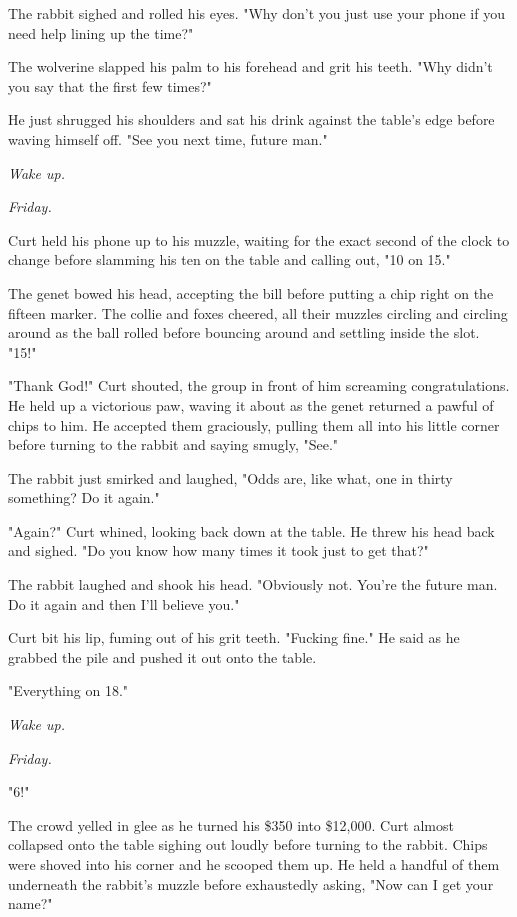 The rabbit sighed and rolled his eyes. "Why don't you just use your phone if you need help lining up the time?"

The wolverine slapped his palm to his forehead and grit his teeth. "Why didn't you say that the first few times?"

He just shrugged his shoulders and sat his drink against the table's edge before waving himself off. "See you next time, future man."

\emph{Wake up.}

\emph{Friday.}

Curt held his phone up to his muzzle, waiting for the exact second of the clock to change before slamming his ten on the table and calling out, "10 on 15."

The genet bowed his head, accepting the bill before putting a chip right on the fifteen marker. The collie and foxes cheered, all their muzzles circling and circling around as the ball rolled before bouncing around and settling inside the slot. "15!"

"Thank God!" Curt shouted, the group in front of him screaming congratulations. He held up a victorious paw, waving it about as the genet returned a pawful of chips to him. He accepted them graciously, pulling them all into his little corner before turning to the rabbit and saying smugly, "See."

The rabbit just smirked and laughed, "Odds are, like what, one in thirty something? Do it again."

"Again?" Curt whined, looking back down at the table. He threw his head back and sighed. "Do you know how many times it took just to get that?"

The rabbit laughed and shook his head. "Obviously not. You're the future man. Do it again and then I'll believe you."

Curt bit his lip, fuming out of his grit teeth. "Fucking fine." He said as he grabbed the pile and pushed it out onto the table.

"Everything on 18."

\emph{Wake up.}

\emph{Friday.}

"6!"

The crowd yelled in glee as he turned his \$350 into \$12,000. Curt almost collapsed onto the table sighing out loudly before turning to the rabbit. Chips were shoved into his corner and he scooped them up. He held a handful of them underneath the rabbit's muzzle before exhaustedly asking, "Now can I get your name?"

